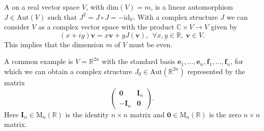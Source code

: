 \documentclass[12pt]{article}
\begin{document}
\newcommand{\mm}{\mathrm{M}}
\newcommand{\oo}{\mathrm{O}}
\newcommand{\R}{\mathbb{R}}
\newcommand{\C}{\mathbb{C}}
\newcommand{\I}{\mathbf{I}}

A \emph{}  on a real vector space $V$, with $\mathrm{dim}(V)=m$, is a linear automorphism $J\in\mathrm{Aut}(V)$ such that $J^2=J\circ J=-\mathrm{id}_V$. With a complex structure $J$ we can consider $V$ as a complex vector space with the product $\C\times V\rightarrow V$ given by $$(x+iy)\mathbf v=x\mathbf v+y J(\mathbf v),\ \ \forall x,y\in\R,\ \mathbf v\in V.$$
This implies  that the dimension $m$ of $V$ must be even.

A common example is $V=\mathbb R^{2n}$ with the standard basis $\mathbf e_1,...,\mathbf e_n,\mathbf f_1,...,\mathbf f_n$, for which we can obtain a complex structure $J_0\in\mathrm{Aut}(\mathbb R^{2n})$ represented by the matrix 
$$\left( \begin{array}{cc}
\mathbf 0 & \I_n \\
-\I_n & \mathbf 0
\end{array} \right).$$
Here $\I_n\in\mm_n(\R)$ is the identity $n\times n$ matrix and
$\mathbf 0\in\mm_n(\R)$ is the zero $n\times n$ matrix.
\end{document}
